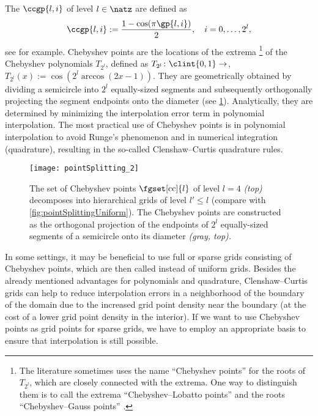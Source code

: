The  $\ccgp{l,i}$ of level $l \in \natz$
are defined as
\begin{equation}
  \ccgp{l,i}
  := \frac{1 - \cos(\pi \gp{l,i})}{2},\quad
  i = 0, \dotsc, 2^l,
\end{equation}
see \cite{Xu16Chebyshev} for example.
Chebyshev points are the locations of the extrema%
\footnote{%
  The literature sometimes uses the name ``Chebyshev points'' for
  the roots of $T_{2^l}$, which are closely connected with the extrema.
  One way to distinguish them is to call the extrema
  ``Chebyshev--Lobatto points'' and the roots
  ``Chebyshev--Gauss points'' \cite{Xu16Chebyshev}.%
}
of the Chebyshev polynomials $T_{2^l}$, defined as
$T_{2^l}\colon \clint{0, 1} \to \real$,
$T_{2^l}(x) := \cos(2^l \arccos(2x - 1))$.
They are geometrically obtained
by dividing a semicircle into $2^l$ equally-sized
segments and subsequently orthogonally projecting the
segment endpoints onto the diameter
(see \cref{fig:pointSplittingChebyshev}).
Analytically, they are determined by minimizing
the interpolation error term in polynomial interpolation.
The most practical use of Chebyshev points is in
polynomial interpolation to avoid Runge's phenomenon and in
numerical integration (quadrature), resulting in the
so-called Clenshaw--Curtis quadrature rules.

\begin{SCfigure}
  \texttt{[image: pointSplitting\_2]}%
  \caption[%
    Decomposition of the set of univariate Clenshaw--Curtis grid points%
  ]{%
    The set of Chebyshev points $\fgset[\cc]{l}$ of level
    $l = 4$ \emph{(top)}
    decomposes into hierarchical grids of level $l' \le l$
    (compare with \cref{fig:pointSplittingUniform}).
    The Chebyshev points are constructed as
    the orthogonal projection of the
    endpoints of $2^l$ equally-sized segments
    of a semicircle onto its diameter \emph{\textcolor{C8}{(gray, top)}.}%
  }%
  \label{fig:pointSplittingChebyshev}%
\end{SCfigure}

In some settings, it may be beneficial to use full or sparse grids consisting
of Chebyshev points, which are then called 
instead of uniform grids.
Besides the already mentioned advantages for polynomials and
quadrature, Clenshaw--Curtis grids can help to reduce interpolation
errors in a neighborhood of the boundary of the domain due to the increased
grid point density near the boundary
(at the cost of a lower grid point density in the interior).
If we want to use Chebyshev points as grid points for sparse grids,
we have to employ an appropriate basis to ensure that interpolation
is still possible.

